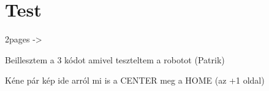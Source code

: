 \chapter{Test}

\label{ch:test}

2pages -> 
	
	Beillesztem a 3 kódot amivel teszteltem a robotot (Patrik)

	Kéne pár kép ide arról mi is a CENTER meg a HOME (az +1 oldal)
